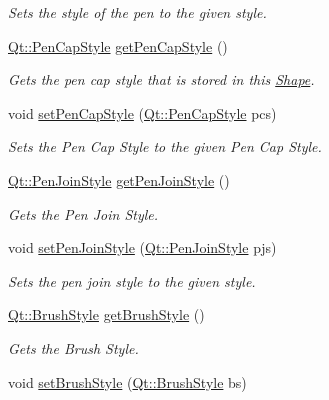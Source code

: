 \begin{DoxyCompactItemize}
\begin{DoxyCompactList}\small\item\em Sets the style of the pen to the given style. \end{DoxyCompactList}\item 
\hyperlink{shape__input__file__specs_8txt_a622efdcfef6789d4367974d2fe79019e}{Qt\+::\+Pen\+Cap\+Style} \hyperlink{classRectangle_a7e42f496cbaa93545c370a1a4aef4d42}{get\+Pen\+Cap\+Style} ()
\begin{DoxyCompactList}\small\item\em Gets the pen cap style that is stored in this \hyperlink{classShape}{Shape}. \end{DoxyCompactList}\item 
void \hyperlink{classRectangle_a18f32cd496f2298ca9165231943c3bae}{set\+Pen\+Cap\+Style} (\hyperlink{shape__input__file__specs_8txt_a622efdcfef6789d4367974d2fe79019e}{Qt\+::\+Pen\+Cap\+Style} pcs)
\begin{DoxyCompactList}\small\item\em Sets the Pen Cap Style to the given Pen Cap Style. \end{DoxyCompactList}\item 
\hyperlink{shape__input__file__specs_8txt_a007db2043c6063881de2043c05c9c4a9}{Qt\+::\+Pen\+Join\+Style} \hyperlink{classRectangle_aaeb26e28ee7b37e166caeb1bf4ea7ec4}{get\+Pen\+Join\+Style} ()
\begin{DoxyCompactList}\small\item\em Gets the Pen Join Style. \end{DoxyCompactList}\item 
void \hyperlink{classRectangle_acdb9bcb2c87a84c84b33a4a99c239de6}{set\+Pen\+Join\+Style} (\hyperlink{shape__input__file__specs_8txt_a007db2043c6063881de2043c05c9c4a9}{Qt\+::\+Pen\+Join\+Style} pjs)
\begin{DoxyCompactList}\small\item\em Sets the pen join style to the given style. \end{DoxyCompactList}\item 
\hyperlink{shape__input__file__specs_8txt_ad07f6fe6c28dcb0b3bdc324a72d0051f}{Qt\+::\+Brush\+Style} \hyperlink{classRectangle_aaa486dcefcdd7e59e63d92c105876724}{get\+Brush\+Style} ()
\begin{DoxyCompactList}\small\item\em Gets the Brush Style. \end{DoxyCompactList}\item 
void \hyperlink{classRectangle_a4d5dff9ac01e605872f80d110015041b}{set\+Brush\+Style} (\hyperlink{shape__input__file__specs_8txt_ad07f6fe6c28dcb0b3bdc324a72d0051f}{Qt\+::\+Brush\+Style} bs)

\end{DoxyCompactItemize}
